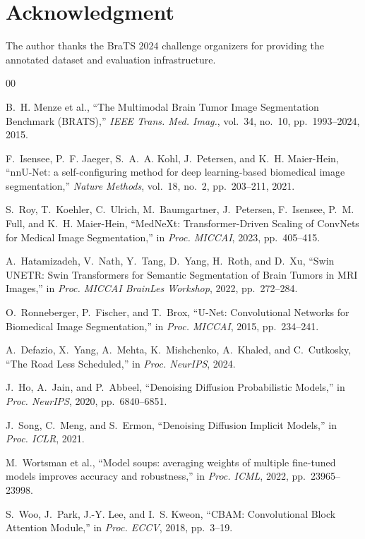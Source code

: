 \documentclass[conference]{IEEEtran}
\begin{document}
\section*{Acknowledgment}

The author thanks the BraTS 2024 challenge organizers for
providing the annotated dataset and evaluation infrastructure.

\begin{thebibliography}{00}

 B.~H. Menze et al.,
``The Multimodal Brain Tumor Image Segmentation Benchmark
(BRATS),''
\textit{IEEE Trans. Med. Imag.}, vol.~34, no.~10,
pp.~1993--2024, 2015.

 F.~Isensee, P.~F. Jaeger, S.~A.~A. Kohl,
J.~Petersen, and K.~H. Maier-Hein,
``nnU-Net: a self-configuring method for deep learning-based
biomedical image segmentation,''
\textit{Nature Methods}, vol.~18, no.~2, pp.~203--211, 2021.

 S.~Roy, T.~Koehler, C.~Ulrich, M.~Baumgartner,
J.~Petersen, F.~Isensee, P.~M. Full, and K.~H. Maier-Hein,
``MedNeXt: Transformer-Driven Scaling of ConvNets for
Medical Image Segmentation,''
in \textit{Proc. MICCAI}, 2023, pp.~405--415.

 A.~Hatamizadeh, V.~Nath, Y.~Tang, D.~Yang,
H.~Roth, and D.~Xu,
``Swin UNETR: Swin Transformers for Semantic Segmentation
of Brain Tumors in MRI Images,''
in \textit{Proc. MICCAI BrainLes Workshop}, 2022,
pp.~272--284.

 O.~Ronneberger, P.~Fischer, and T.~Brox,
``U-Net: Convolutional Networks for Biomedical Image
Segmentation,''
in \textit{Proc. MICCAI}, 2015, pp.~234--241.

 A.~Defazio, X.~Yang, A.~Mehta, K.~Mishchenko,
A.~Khaled, and C.~Cutkosky,
``The Road Less Scheduled,''
in \textit{Proc. NeurIPS}, 2024.

 J.~Ho, A.~Jain, and P.~Abbeel,
``Denoising Diffusion Probabilistic Models,''
in \textit{Proc. NeurIPS}, 2020, pp.~6840--6851.

 J.~Song, C.~Meng, and S.~Ermon,
``Denoising Diffusion Implicit Models,''
in \textit{Proc. ICLR}, 2021.

 M.~Wortsman et al.,
``Model soups: averaging weights of multiple fine-tuned
models improves accuracy and robustness,''
in \textit{Proc. ICML}, 2022, pp.~23965--23998.

 S.~Woo, J.~Park, J.-Y. Lee, and I.~S. Kweon,
``CBAM: Convolutional Block Attention Module,''
in \textit{Proc. ECCV}, 2018, pp.~3--19.


\end{thebibliography}
\end{document}

